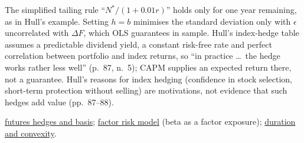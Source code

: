 \begin{qfmodel}
 The simplified tailing rule ``$N^*/(1+0.01r)$'' holds only for one year remaining, as in Hull's example. Setting $h=b$ minimises the standard deviation only with $\epsilon$ uncorrelated with $\Delta F$, which OLS guarantees in sample. Hull's index-hedge table assumes a predictable dividend yield, a constant risk-free rate and perfect correlation between portfolio and index returns, so ``in practice \dots\ the hedge works rather less well'' (p.~87, n.~5); CAPM supplies an expected return there, not a guarantee. Hull's reasons for index hedging (confidence in stock selection, short-term protection without selling) are motivations, not evidence that such hedges add value (pp.~87--88).

 \hyperref[def:futures-hedge-basis]{futures hedges and basis}; \hyperref[mod:factor-risk-model]{factor risk model} (beta as a factor exposure); \hyperref[mod:duration-convexity]{duration and convexity}.


\end{qfmodel}
